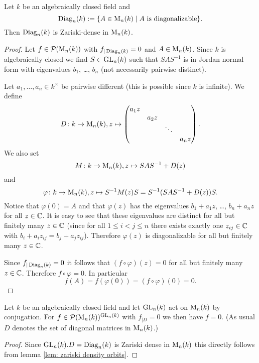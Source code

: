 \begin{prop}
 Let $k$ be an algebraically closed field and
 \[
  \operatorname{Diag}_n(k) := \{A \in \operatorname{M}_n(k) \mid \text{$A$ is diagonalizable}\}.
 \]
 Then $\operatorname{Diag}_n(k)$ is Zariski-dense in $\operatorname{M}_n(k)$.
\end{prop}
\begin{proof}
 Let $f \in \mathcal{P}(\operatorname{M}_n(k))$ with $f_{|\operatorname{Diag}_n(k)} = 0$ and $A \in \operatorname{M}_n(k)$. Since $k$ is algebraically closed we find $S \in \operatorname{GL}_n(k)$ such that $SAS^{-1}$ is in Jordan normal form with eigenvalues $b_1$, \dots, $b_n$ (not necessarily pairwise distinct).
 
 Let $a_1, \dotsc, a_n \in k^\times$ be pairwise different (this is possible since $k$ is infinite). We define
 \[
  D \colon k \to \operatorname{M}_n(k), z \mapsto
  \begin{pmatrix}
   a_1 z &       &        &       \\
         & a_2 z &        &       \\
         &       & \ddots &       \\
         &       &        & a_n z
  \end{pmatrix}.
 \]
 We also set
 \[
  M \colon k \to \operatorname{M}_n(k), z \mapsto SAS^{-1} + D(z)
 \]
 and
 \[
  \varphi \colon k \to \operatorname{M}_n(k), z \mapsto S^{-1} M(z) S = S^{-1}(SAS^{-1}+D(z))S.
 \]
 Notice that $\varphi(0) = A$ and that $\varphi(z)$ has the eigenvalues $b_1 + a_1 z$, \dots, $b_n + a_n z$ for all $z \in \mathbb{C}$. It is easy to see that these eigenvalues are distinct for all but finitely many $z \in \mathbb{C}$ (since for all $1 \leq i < j \leq n$ there exists exactly one $z_{ij} \in \mathbb{C}$ with $b_i + a_i z_{ij} = b_j + a_j z_{ij}$). Therefore $\varphi(z)$ is diagonalizable for all but finitely many $z \in \mathbb{C}$.
 
 Since $f_{|\operatorname{Diag}_n(k)} = 0$ it follows that $(f \circ \varphi)(z) = 0$ for all but finitely many $z \in \mathbb{C}$. Therefore $f \circ \varphi = 0$. In particular
 \[
  f(A) = f(\varphi(0)) = (f \circ \varphi)(0) = 0.
 \]
\end{proof}


\begin{cor}
 Let $k$ be an algebraically closed field and let $\operatorname{GL}_n(k)$ act on $\operatorname{M}_n(k)$ by conjugation. For $f \in \mathcal{P}(\operatorname{M}_n(k))^{\operatorname{GL}_n(k)}$ with $f_{|D} = 0$ we then have $f = 0$. (As usual $D$ denotes the set of diagonal matrices in $\operatorname{M}_n(k)$.)
\end{cor}
\begin{proof}
 Since $\operatorname{GL}_n(k).D = \operatorname{Diag}_n(k)$ is Zariski dense in $\operatorname{M}_n(k)$ this directly follows from lemma \ref{lem: zariski density orbits}.
\end{proof}


